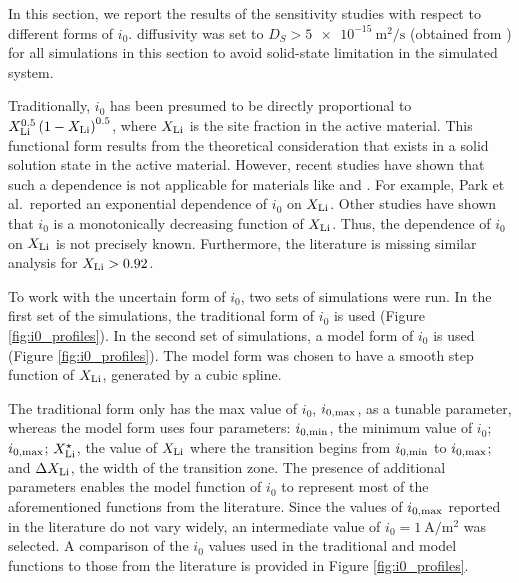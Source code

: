 \documentclass{article}
\begin{document}

In this section, we report the results of the sensitivity studies with
respect to different forms of $i_0$.  diffusivity was set to
$D_S>\SI{5e-15}{\meter\squared\per\second}$ (obtained from
\cite{amin2015}) for all simulations in this section to avoid
solid-state limitation in the simulated system.


Traditionally, $i_0$ has been presumed to be directly proportional to
$X_{\rm{Li}}^{0.5}\left(1-X_{\rm{Li}}\right)^{0.5}$, where
$X_{\rm{Li}}$ is the  site fraction in the active
material\cite{newman1994-2,newman1993,newman1996,newman1995-2}. This
functional form results from the theoretical consideration that
 exists in a solid solution state in the active
material. However, recent studies have shown that such a dependence is
not applicable for materials like \nca{}\cite{chueh2021} and
\nmc{}\cite{mukherjee2017,chiang2020,tsai2018}. For example, Park et
al.\cite{chueh2021}\ reported an exponential dependence of $i_0$ on
$X_{\rm{Li}}$\cite{chueh2021}. Other studies have shown that $i_0$ is
a monotonically decreasing function of
$X_{\rm{Li}}$\cite{mukherjee2017,chiang2020,tsai2018}. Thus, the
dependence of $i_0$ on $X_{\rm{Li}}$ is not precisely
known. Furthermore, the literature is missing similar analysis for
$X_{\rm{Li}} > 0.92$.

To work with the uncertain form of $i_0$, two sets of simulations were
run. In the first set of the simulations, the traditional form of
$i_0$ is used (Figure \ref{fig:i0_profiles}). In the second set of
simulations, a model form of $i_0$ is used (Figure
\ref{fig:i0_profiles}). The model form was chosen to have a smooth
step function of $X_{\rm{Li}}$, generated by a cubic spline.

The traditional form only has the max value of $i_0$,
$i_{0,\rm{max}}$, as a tunable parameter, whereas the model form uses
four parameters: $i_{0,\rm{min}}$, the minimum value of $i_0$;
$i_{0,\rm{max}}$; $X_{\rm{Li}}^{\star}$, the value of $X_{\rm{Li}}$
where the transition begins from $i_{0,\rm{min}}$ to $i_{0,\rm{max}}$;
and $\Delta X_{\rm{Li}}$, the width of the transition zone. The
presence of additional parameters enables the model function of $i_0$
to represent most of the aforementioned functions from the
literature. Since the values of $i_{0,\rm{max}}$ reported in the
literature\cite{tsai2018,dees2008} do not vary widely, an intermediate
value of $i_0 = \SI{1}{\ampere\per\meter\squared}$ was selected. A
comparison of the $i_0$ values used in the traditional and model
functions to those from the literature is provided in Figure
\ref{fig:i0_profiles}.
\end{document}
